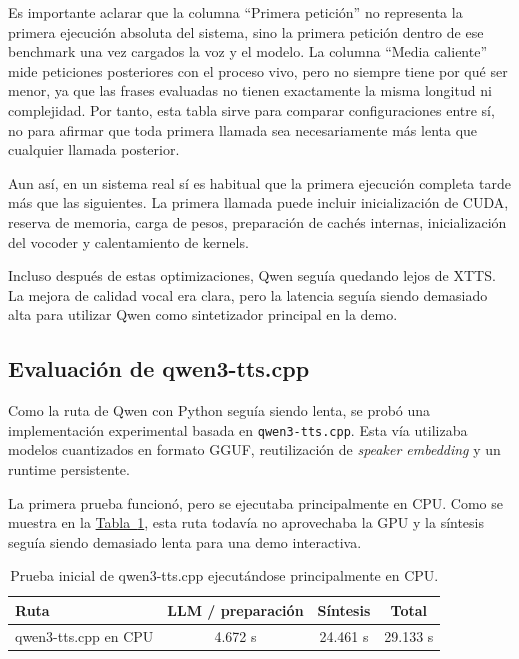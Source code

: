 Es importante aclarar que la columna ``Primera petición'' no representa la primera ejecución absoluta del sistema, sino la primera petición dentro de ese benchmark una vez cargados la voz y el modelo. La columna ``Media caliente'' mide peticiones posteriores con el proceso vivo, pero no siempre tiene por qué ser menor, ya que las frases evaluadas no tienen exactamente la misma longitud ni complejidad. Por tanto, esta tabla sirve para comparar configuraciones entre sí, no para afirmar que toda primera llamada sea necesariamente más lenta que cualquier llamada posterior.

Aun así, en un sistema real sí es habitual que la primera ejecución completa tarde más que las siguientes. La primera llamada puede incluir inicialización de CUDA, reserva de memoria, carga de pesos, preparación de cachés internas, inicialización del vocoder y calentamiento de kernels.

Incluso después de estas optimizaciones, Qwen seguía quedando lejos de XTTS. La mejora de calidad vocal era clara, pero la latencia seguía siendo demasiado alta para utilizar Qwen como sintetizador principal en la demo.

\subsection{Evaluación de qwen3-tts.cpp}

Como la ruta de Qwen con Python seguía siendo lenta, se probó una implementación experimental basada en \texttt{qwen3-tts.cpp}. Esta vía utilizaba modelos cuantizados en formato GGUF, reutilización de \textit{speaker embedding} y un runtime persistente.

La primera prueba funcionó, pero se ejecutaba principalmente en CPU. Como se muestra en la \hyperref[tab:qwen-cpp-cpu]{Tabla~\ref*{tab:qwen-cpp-cpu}}, esta ruta todavía no aprovechaba la GPU y la síntesis seguía siendo demasiado lenta para una demo interactiva.

\begin{table}[ht]
\centering
\begin{tabular}{lccc}
\toprule
Ruta & LLM / preparación & Síntesis & Total \\
\midrule
qwen3-tts.cpp en CPU & 4.672 s & 24.461 s & 29.133 s \\
\bottomrule
\end{tabular}
\caption{Prueba inicial de qwen3-tts.cpp ejecutándose principalmente en CPU.}
\label{tab:qwen-cpp-cpu}
\end{table}

